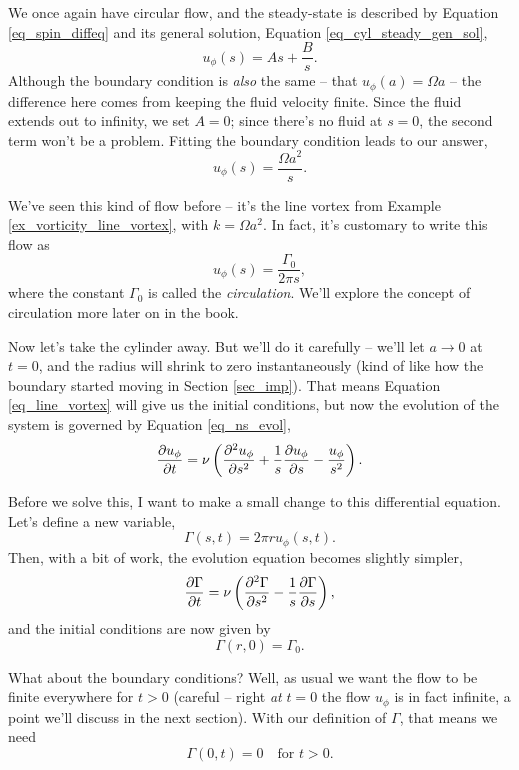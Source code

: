We once again have circular flow, and the steady-state is described by Equation \ref{eq_spin_diffeq} and its general solution, Equation \ref{eq_cyl_steady_gen_sol},
\[
u_\phi (s) = As + \frac{B}{s}.
\]
Although the boundary condition is \emph{also} the same -- that $u_\phi(a) = \Omega a$ -- the difference here comes from keeping the fluid velocity finite.  Since the fluid extends out to infinity, we set $A = 0$; since there's no fluid at $s=0$, the second term won't be a problem.  Fitting the boundary condition leads to our answer,
\[
u_\phi(s) = \frac{\Omega a^2}{s}.
\]

We've seen this kind of flow before -- it's the line vortex from Example \ref{ex_vorticity_line_vortex}, with $k=\Omega a^2$.  In fact, it's customary to write this flow as
\begin{equation}
\label{eq_line_vortex}
u_\phi(s) = \frac{\Gamma_0}{2\pi s},
\end{equation}
where the constant $\Gamma_0$ is called the \emph{circulation}.  We'll explore the concept of circulation more later on in the book.

Now let's take the cylinder away.  But we'll do it carefully -- we'll let $a \to 0$ at $t=0$, and the radius will shrink to zero instantaneously (kind of like how the boundary started moving in Section \ref{sec_imp}).  That means Equation \ref{eq_line_vortex} will give us the initial conditions, but now the evolution of the system is governed by Equation \ref{eq_ns_evol},
\[
\frac{\partial {u_\phi}}{\partial {t}} =  \nu \left( \frac{\partial^2 {u_\phi}}{\partial {s}^2} + \frac{1}{s} \frac{\partial {u_\phi}}{\partial {s}} - \frac{u_\phi}{s^2} \right).
\]

Before we solve this, I want to make a small change to this differential equation.  Let's define a new variable,
\begin{equation}
\Gamma (s, t) = 2\pi r u_\phi(s, t).
\end{equation}
Then, with a bit of work, the evolution equation becomes slightly simpler,
\begin{equation}
\label{eq_evol_gamma}
\frac{\partial {\Gamma}}{\partial {t}} = \nu \left( \frac{\partial^2 {\Gamma}}{\partial {s}^2} - \frac{1}{s} \frac{\partial {\Gamma}}{\partial {s}} \right),
\end{equation}
and the initial conditions are now given by
\begin{equation}
\Gamma(r, 0) = \Gamma_0.
\end{equation}

What about the boundary conditions?  Well, as usual we want the flow to be finite everywhere for $t>0$ (careful -- right \emph{at} $t=0$ the flow $u_\phi$ is in fact infinite, a point we'll discuss in the next section).  With our definition of $\Gamma$, that means we need
\begin{equation}
\Gamma(0, t) = 0 \quad \text{for } t>0.
\end{equation}

